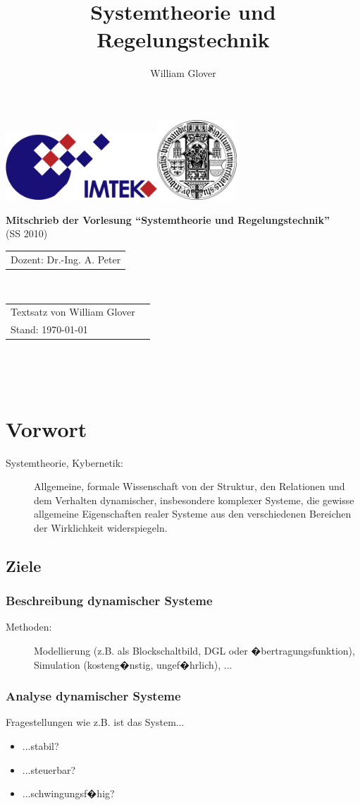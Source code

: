 \documentclass[12pt,a4paper,ngerman]{scrartcl}
\author{William Glover}
\title{Systemtheorie und Regelungstechnik}
\renewcommand\maketitle{
    \begin{titlepage}
        \sffamily
        \thispagestyle{empty}
              \includegraphics[height=2.5cm]{IMTEK_Logo_Farbe}\hfill\includegraphics[height=3cm]{Uni_Siegel}
        \par
        \vspace{2cm}
        \begin{center}
            \Huge \textbf{Mitschrieb der Vorlesung ``Systemtheorie und Regelungstechnik''}\\
            (SS 2010)\\[6cm]
            \end{center}
           

            \begin{tabular}{l}
                \large Dozent: Dr.-Ing. A. Peter\\
         \end{tabular}
         \\
						\begin{tabular}{ll}
                \large Textsatz von William Glover \\
                \large Stand: \today
            \end{tabular}
        
        

 			 \newpage 
       \thispagestyle{empty}~
       \newpage

 
\end{titlepage}
}
\renewcommand{\baselinestretch}{1.5} %
\begin{document}
\maketitle %
\clearpage %
\renewcommand{\baselinestretch}{1.5} %
\thispagestyle{empty} %

\tableofcontents %
\newpage 

        
        \thispagestyle{empty}~
        \newpage
     

\setcounter{page}{2} %


\addtocounter{section}{-1}%
\section{Vorwort}

\begin{description}
\item[Systemtheorie, Kybernetik:] Allgemeine, formale Wissenschaft von der Struktur, den Relationen und dem Verhalten dynamischer, insbesondere komplexer Systeme, die gewisse allgemeine Eigenschaften realer Systeme aus den verschiedenen Bereichen der Wirklichkeit widerspiegeln. 
\end{description}

\subsection*{Ziele}

\subsubsection*{Beschreibung dynamischer Systeme}
\begin{description}
\item[Methoden:] Modellierung (z.B. als Blockschaltbild, DGL oder �bertragungsfunktion), Simulation (kosteng�nstig, ungef�hrlich), ...
\end{description}

\subsubsection*{Analyse dynamischer Systeme}
Fragestellungen wie z.B. ist das System...
\begin{itemize}
\item ...stabil?
\item ...steuerbar?
\item ...schwingungsf�hig?
\end{itemize}
\end{document}
